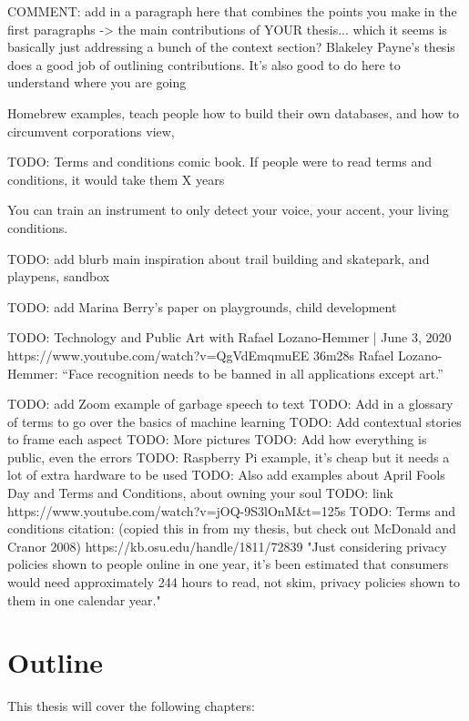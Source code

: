 COMMENT: add in a paragraph here that combines the points you make in the first paragraphs -> the main contributions of YOUR thesis... which it seems is basically just addressing a bunch of the context section? Blakeley Payne's thesis does a good job of outlining contributions. It's also good to do here to understand where you are going

Homebrew examples, teach people how to build their own databases, and how to circumvent corporations view,

TODO: Terms and conditions comic book. If people were to read terms and conditions, it would take them X years

You can train an instrument to only detect your voice, your accent, your living conditions.

TODO: add blurb main inspiration about trail building and skatepark, and playpens, sandbox

TODO: add Marina Berry’s paper on playgrounds, child development

TODO: Technology and Public Art with Rafael Lozano-Hemmer | June 3, 2020
https://www.youtube.com/watch?v=QgVdEmqmuEE
36m28s
Rafael Lozano-Hemmer: “Face recognition needs to be banned in all applications except art.”

TODO: add Zoom example of garbage speech to text
TODO: Add in a glossary of terms to go over the basics of machine learning
TODO: Add contextual stories to frame each aspect
TODO: More pictures
TODO: Add how everything is public, even the errors
TODO: Raspberry Pi example, it’s cheap but it needs a lot of extra hardware to be used
TODO: Also add examples about April Fools Day and Terms and Conditions, about owning your soul
TODO: link https://www.youtube.com/watch?v=jOQ-9S3lOnM\&t=125s
TODO: Terms and conditions citation: (copied this in from my thesis, but check out McDonald and Cranor 2008) https://kb.osu.edu/handle/1811/72839 "Just considering privacy policies shown to people online in one year, it's been estimated that consumers would need approximately 244 hours to read, not skim, privacy policies shown to them in one calendar year."


\section{Outline}

This thesis will cover the following chapters:


